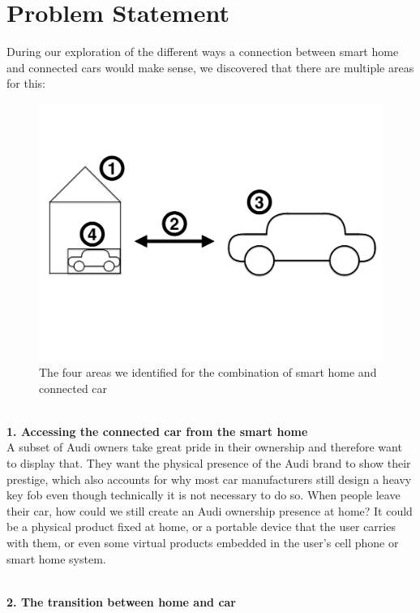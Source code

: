 \section{Problem Statement}
\label{sec:problem}

During our exploration of the different ways a connection between smart home and connected cars would make sense, we discovered that there are multiple areas for this:

\begin{figure}[ht]
	\centering
	\includegraphics[width=\textwidth]{Figures/Development/CarAndHomeEquals}
	\caption{The four areas we identified for the combination of smart home and connected car}
	\label{fig:CarAndHome}
\end{figure}

\noindent
\\\textbf{1. Accessing the connected car from the smart home}
\\A subset of Audi owners take great pride in their ownership and therefore want to display that. They want the physical presence of the Audi brand to show their prestige, which also accounts for why most car manufacturers still design a heavy key fob even though technically it is not necessary to do so. When people leave their car, how could we still create an Audi ownership presence at home? It could be a physical product fixed at home, or a portable device that the user carries with them, or even some virtual products embedded in the user's cell phone or smart home system.

\noindent
\\\textbf{2. The transition between home and car}


